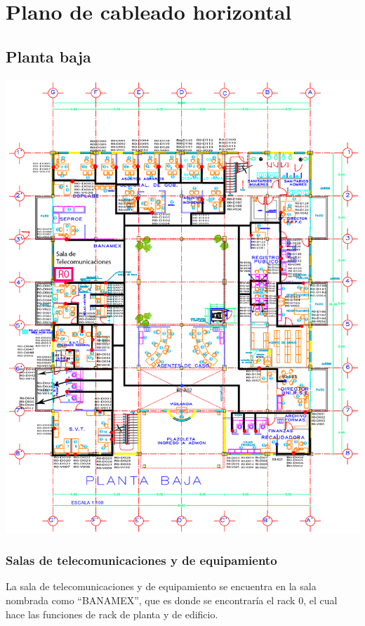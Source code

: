 \chapter{Plano de cableado horizontal}
\section{Planta baja}
\begin{center}
	\includegraphics[scale=1.01]{CHPB.png}
\end{center}
\subsection{Salas de telecomunicaciones y de equipamiento}
La sala de telecomunicaciones y de equipamiento se encuentra en la sala nombrada como ``BANAMEX'', que es donde se encontraría el rack 0, el cual hace las funciones de rack de planta y de edificio.

